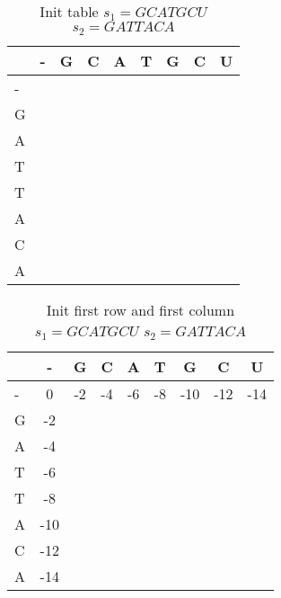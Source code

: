 \documentclass[11pt]{article}
\begin{document}
\begin{table}[h]
	\caption{Init table $s_1 = GCATGCU$ $s_2 = GATTACA$}
	\label{tab:init_NW}
	\centering

	\begin{tabular}{l|c ccccccc}
	\hline

	\hline
		  & - & G & C & A & T & G & C & U \\
	\hline
	 	- &   &   &   &   &   &   &   &  \\
	 	G &   &   &   &   &   &   &   &  \\
	 	A &   &   &   &   &   &   &   &  \\
	 	T &   &   &   &   &   &   &   &  \\
	 	T &   &   &   &   &   &   &   &  \\
	 	A &   &   &   &   &   &   &   &  \\
	 	C &   &   &   &   &   &   &   &  \\
	 	A &   &   &   &   &   &   &   &  \\
	

	\hline
	\end{tabular}
\end{table}
\begin{table}[h]
	\caption{Init first row and first column $s_1 = GCATGCU$ $s_2 = GATTACA$}
	\label{tab:init_rw_NW}
	\centering

	\begin{tabular}{l|c ccccccc}
	\hline

	\hline
		  & - & G & C & A & T & G & C & U \\
	\hline
	 	- & 0  & -2& -4& -6& -8&-10&-12&-14\\
	 	G & -2 &   &   &   &   &   &   &   \\
	 	A & -4 &   &   &   &   &   &   &   \\
	 	T & -6 &   &   &   &   &   &   &   \\
	 	T & -8 &   &   &   &   &   &   &   \\
	 	A & -10&   &   &   &   &   &   &   \\
	 	C & -12&   &   &   &   &   &   &   \\
	 	A & -14&   &   &   &   &   &   &   \\
	

	\hline
	\end{tabular}
\end{table}
\end{document}
